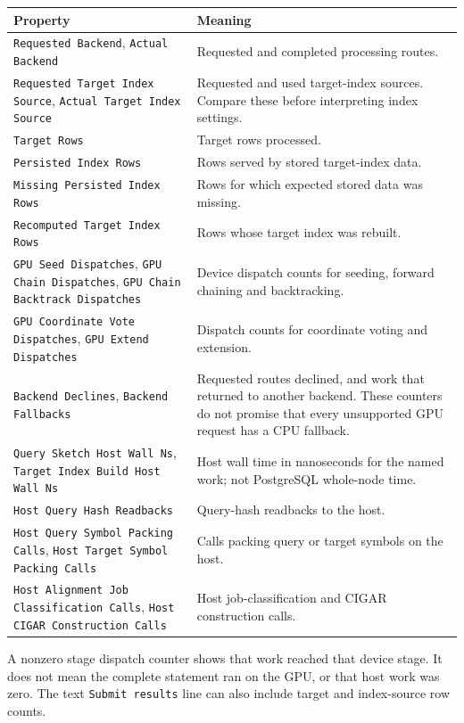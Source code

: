 \begingroup\small
\begin{longtable}{@{}p{.49\linewidth}p{.46\linewidth}@{}}
\toprule
\textbf{Property} & \textbf{Meaning}\\
\midrule\endhead
\texttt{Requested Backend}, \texttt{Actual Backend} & Requested and
completed processing routes.\\
\texttt{Requested Target Index Source},
\texttt{Actual Target Index Source} & Requested and used target-index
sources. Compare these before interpreting index settings.\\
\texttt{Target Rows} & Target rows processed.\\
\texttt{Persisted Index Rows} & Rows served by stored target-index data.\\
\texttt{Missing Persisted Index Rows} & Rows for which expected stored
data was missing.\\
\texttt{Recomputed Target Index Rows} & Rows whose target index was rebuilt.\\
\texttt{GPU Seed Dispatches}, \texttt{GPU Chain Dispatches},
\texttt{GPU Chain Backtrack Dispatches} & Device dispatch counts for
seeding, forward chaining and backtracking.\\
\texttt{GPU Coordinate Vote Dispatches}, \texttt{GPU Extend Dispatches}
& Dispatch counts for coordinate voting and extension.\\
\texttt{Backend Declines}, \texttt{Backend Fallbacks} & Requested routes
declined, and work that returned to another backend. These counters do not
promise that every unsupported GPU request has a CPU fallback.\\
\texttt{Query Sketch Host Wall Ns},
\texttt{Target Index Build Host Wall Ns} & Host wall time in nanoseconds
for the named work; not PostgreSQL whole-node time.\\
\texttt{Host Query Hash Readbacks} & Query-hash readbacks to the host.\\
\texttt{Host Query Symbol Packing Calls},
\texttt{Host Target Symbol Packing Calls} & Calls packing query or target
symbols on the host.\\
\texttt{Host Alignment Job Classification Calls},
\texttt{Host CIGAR Construction Calls} & Host job-classification and CIGAR
construction calls.\\
\bottomrule
\end{longtable}
\endgroup

A nonzero stage dispatch counter shows that work reached that device stage.
It does not mean the complete statement ran on the GPU, or that host work was
zero. The text \texttt{Submit results} line can also include target and
index-source row counts.


